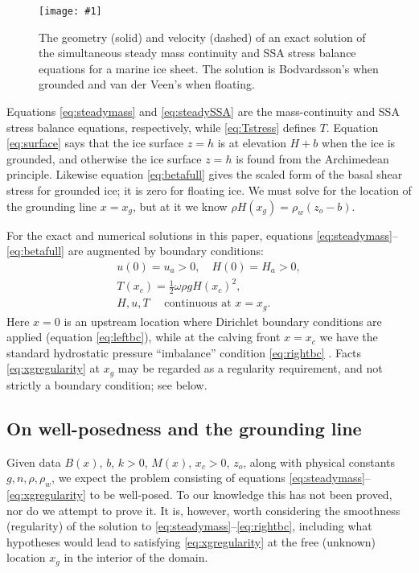 \documentclass[review,letterpaper]{igs}
\newcommand{\onecol}[1]{\texttt{[image: \#1]}}
\begin{document}
\begin{figure}[ht]
\onecol{exactmarine-geometry}
\caption{The geometry (solid) and velocity (dashed) of an exact solution of the simultaneous steady mass continuity and SSA stress balance equations for a marine ice sheet.  The solution is Bodvardsson's when grounded and van der Veen's when floating.} \label{fig:exactmarine}
\end{figure}

Equations \eqref{eq:steadymass} and \eqref{eq:steadySSA} are the mass-continuity and SSA stress balance equations, respectively, while \eqref{eq:Tstress} defines $T$.  Equation \eqref{eq:surface} says that the ice surface $z=h$ is at elevation $H+b$ when the ice is grounded, and otherwise the ice surface $z=h$ is found from the Archimedean principle.  Likewise equation \eqref{eq:betafull} gives the scaled form of the basal shear stress for grounded ice; it is zero for floating ice.  We must solve for the location of the grounding line $x=x_g$, but at it we know $\rho H(x_g) = \rho_w (z_o - b)$.

For the exact and numerical solutions in this paper, equations \eqref{eq:steadymass}--\eqref{eq:betafull} are augmented by boundary conditions:
\begin{gather}
u(0) = u_a > 0, \quad H(0) = H_a > 0, \label{eq:leftbc} \\
T(x_c) = \frac{1}{2} \omega \rho g H(x_c)^2,  \label{eq:rightbc} \\
H, u, T \quad \text{ continuous at } x = x_g.  \label{eq:xgregularity}
\end{gather}
Here $x=0$ is an upstream location where Dirichlet boundary conditions are applied (equation \eqref{eq:leftbc}), while at the calving front $x=x_c$ we have the standard hydrostatic pressure ``imbalance'' condition \eqref{eq:rightbc} \citep{SchoofMarine1}.  Facts \eqref{eq:xgregularity} at $x_g$ may be regarded as a regularity requirement, and not strictly a boundary condition; see below.

\subsection*{On well-posedness and the grounding line}  Given data $B(x)$, $b$, $k>0$, $M(x)$, $x_c>0$, $z_o$, along with physical constants $g,n,\rho,\rho_w$, we expect the problem consisting of equations \eqref{eq:steadymass}--\eqref{eq:xgregularity} to be well-posed.  To our knowledge this has not been proved, nor do we attempt to prove it.  It is, however, worth considering the smoothness (regularity) of the solution to \eqref{eq:steadymass}--\eqref{eq:rightbc}, including what hypotheses would lead to satisfying \eqref{eq:xgregularity} at the free (unknown) location $x_g$ in the interior of the domain.
\end{document}
